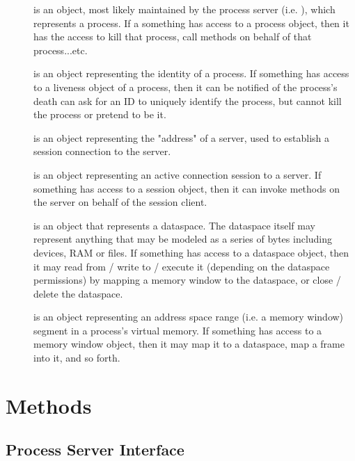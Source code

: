 \begin{description}

	\item[] is an object, most likely maintained by the process
	server (i.e. ), which represents a process. If a something
	has access to a process object, then it has the access to kill that
	process, call methods on behalf of that process...etc.
      
	\item[] is an object representing the identity of a process.
	If something has access to a liveness object of a process, then it can be
	notified of the process's death can ask for an ID to uniquely identify the
	process, but cannot kill the process or pretend to be it.
       
	\item[] is an object representing the "address" of a server, used
	to establish a session connection to the server.
    
	\item[] is an object representing an active connection session
	to a server.  If something has access to a session object, then it can
	invoke methods on the server on behalf of the session client.
    
	\item[] is an object that represents a dataspace. The
	dataspace itself may represent anything that may be modeled as a series of
	bytes including devices, RAM or files.  If something has access to a
	dataspace object, then it may read from / write to / execute it (depending
	on the dataspace permissions) by mapping a memory window to the dataspace,
	or close / delete the dataspace.
      
	\item[] is an object representing an address space range
	(i.e. a memory window) segment in a process's virtual memory. If something has
	access to a memory window object, then it may map it to a dataspace, map a
	frame into it, and so forth.
    
\end{description}

\section{Methods}

\subsection{Process Server Interface}


